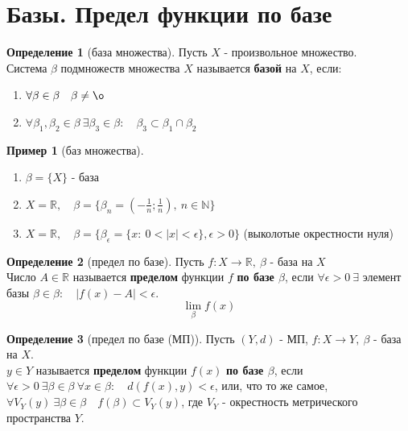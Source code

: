 \documentclass{report}
\theoremstyle{definition}
\newtheorem{definition}{Определение}[section]
\newtheorem{example}{Пример}
\begin{document}
\section{Базы. Предел функции по базе}

\begin{definition}[база множества]
  Пусть $X$ - произвольное множество.\\

  Система $\beta$ подмножеств множества $X$ называется \textbf{базой} на $X$, если:
  \begin{enumerate}
    \item $\forall \beta \in \beta \quad \beta \ne \o$
    \item $\forall \beta_{1}, \beta_{2} \in \beta \ \exists \beta_{3} \in \beta: \quad \beta_{3} \subset \beta_{1}
            \cap \beta_{2}$
  \end{enumerate}
\end{definition}

\begin{example}[баз множества]
  \begin{enumerate}
    \item $\beta = \{X\}$ - база
    \item $X = \mathbb{R}, \quad \beta = \{\beta_{n} = (-\frac{1}{n};\frac{1}{n}), \ n \in \mathbb{N}\}$
    \item $X = \mathbb{R}, \quad \beta = \{\beta_{\epsilon} = \{x: \  0 < |x| < \epsilon\}, \epsilon > 0\}$
          (выколотые окрестности нуля)
  \end{enumerate}
\end{example}

\begin{definition}[предел по базе]
  Пусть $f:X\rightarrow\mathbb{R}, \ \beta$ - база на $X$\\

  Число $A\in\mathbb{R}$ называется \textbf{пределом} функции $f$ \textbf{по базе $\beta$}, если
  $\forall \epsilon > 0 \ \exists$ элемент базы $\beta \in \beta: \quad |f(x) - A| < \epsilon$.
  \begin{equation*}
    \underset{\beta}{\lim} f(x)
  \end{equation*}
\end{definition}

\begin{definition}[предел по базе (МП)]
  Пусть $(Y, d)$ - МП, $f:X\rightarrow Y, \ \beta$ - база на $X$.\\

  $y\in Y$ называется \textbf{пределом} функции $f(x)$ \textbf{по базе $\beta$}, если $\forall \epsilon > 0 \
    \exists \beta \in \beta \ \forall x \in \beta: \quad d(f(x), y) < \epsilon$, или, что то же самое,
  $\forall V_{Y}(y) \ \exists \beta \in \beta \quad f(\beta) \subset V_{Y}(y)$, где $V_{Y}$ - окрестность
  метрического пространства $Y$.
\end{definition}
\end{document}
